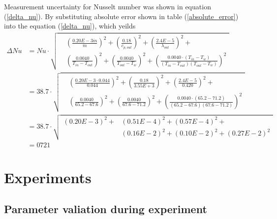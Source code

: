 \documentclass[12pt,oneside]{jbook}
\begin{document}
Measurement uncertainty for Nusselt number was shown in equation (\ref{delta_nu}).
By substituting absolute error shown in table (\ref{absolute_error}) into the equation (\ref{delta_nu}), which yeilds
\begin{align}
    \Delta Nu & = Nu\cdot
    \sqrt{
    \begin{aligned}
        & \left(\frac{0.20E-3\dot{m}}{\dot{m}}\right)^{2}
        + \left(\frac{0.18}{c_{p,out}}\right)^{2}
        + \left(\frac{2.4E-5}{\lambda_{out}}\right)^{2}+\\
        & \left(\frac{0.0040}{T_{in} - T_{out}}\right)^{2}
        + \left(\frac{0.0040}{T_{out} - T_{w}}\right)^{2}
        + \left(\frac{0.0040\cdot \left( T_{in} - T_{w}\right)}{\left( T_{in} - T_{out}\right)\left( T_{out}-T_{w} \right)} \right)^{2}
    \end{aligned}
          }\\
    & = 38.7\cdot
    \sqrt{
    \begin{aligned}
        & \left(\frac{0.20E-3\cdot 0.044}{0.044}\right)^{2}
        + \left(\frac{0.18}{3.55E+3}\right)^{2}
        + \left(\frac{2.4E-5}{0.420}\right)^{2}+\\
        & \left(\frac{0.0040}{65.2 - 67.6}\right)^{2}
        + \left(\frac{0.0040}{67.6 - 71.2}\right)^{2}
        + \left(\frac{0.0040\cdot \left(65.2 - 71.2\right)}{\left(65.2 - 67.6\right)\left(67.6 - 71.2\right)}\right)^{2}
    \end{aligned}
         }\\
    & = 38.7\cdot
    \sqrt{
    \begin{aligned}
        \left(0.20E-3\right)^{2} +
        & \left(0.51E-4\right)^{2}
        + \left(0.57E-4\right)^{2} +\\
        & \left(0.16E-2\right)^{2}
        + \left(0.10E-2\right)^{2}
        + \left(0.27E-2\right)^{2}
    \end{aligned}
         }\\
    & = 0721
\end{align}








\chapter{Experiments}
\section{Parameter valiation during experiment}
\clearpage
\end{document}
